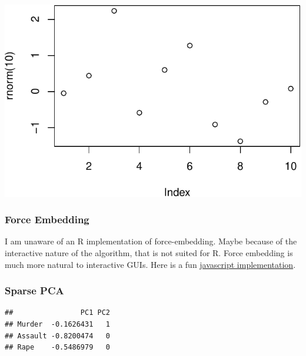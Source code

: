 \documentclass[]{book}
\newenvironment{Shaded}{\begin{snugshade}}{\end{snugshade}}
\newcommand{\KeywordTok}[1]{\textcolor[rgb]{0.13,0.29,0.53}{\textbf{#1}}}
\newcommand{\DataTypeTok}[1]{\textcolor[rgb]{0.13,0.29,0.53}{#1}}
\newcommand{\DecValTok}[1]{\textcolor[rgb]{0.00,0.00,0.81}{#1}}
\newcommand{\FloatTok}[1]{\textcolor[rgb]{0.00,0.00,0.81}{#1}}
\newcommand{\StringTok}[1]{\textcolor[rgb]{0.31,0.60,0.02}{#1}}
\newcommand{\CommentTok}[1]{\textcolor[rgb]{0.56,0.35,0.01}{\textit{#1}}}
\newcommand{\OtherTok}[1]{\textcolor[rgb]{0.56,0.35,0.01}{#1}}
\newcommand{\OperatorTok}[1]{\textcolor[rgb]{0.81,0.36,0.00}{\textbf{#1}}}
\newcommand{\NormalTok}[1]{#1}
\theoremstyle{definition}
\theoremstyle{definition}
\theoremstyle{definition}
\theoremstyle{remark}
\begin{document}
\includegraphics[width=0.5\linewidth]{Rcourse_files/figure-latex/unnamed-chunk-257-1}

\subsubsection{Force Embedding}\label{force-embedding}

I am unaware of an R implementation of force-embedding. Maybe because of
the interactive nature of the algorithm, that is not suited for R. Force
embedding is much more natural to interactive GUIs. Here is a fun
\href{http://bl.ocks.org/eesur/be2abfb3155a38be4de4}{javascript
implementation}.

\subsubsection{Sparse PCA}\label{sparse-pca}

\begin{Shaded}
\end{Shaded}

\begin{verbatim}
##                PC1 PC2
## Murder  -0.1626431   1
## Assault -0.8200474   0
## Rape    -0.5486979   0
\end{verbatim}
\end{document}
